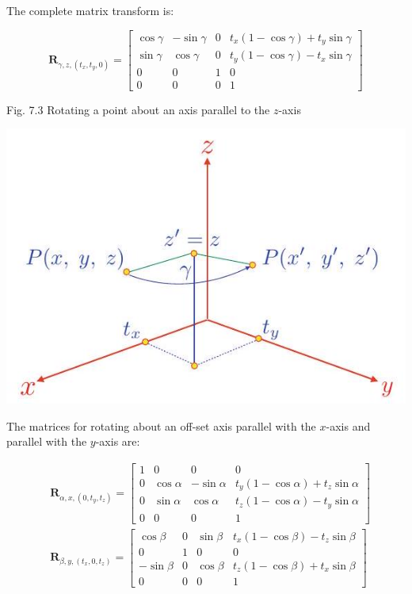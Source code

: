 \documentclass[10pt]{article}
\begin{document}
The complete matrix transform is:

$$
\mathbf{R}_{\gamma, z,\left(t_{x}, t_{y}, 0\right)}=\left[\begin{array}{cccc}
\cos \gamma & -\sin \gamma & 0 & t_{x}(1-\cos \gamma)+t_{y} \sin \gamma \\
\sin \gamma & \cos \gamma & 0 & t_{y}(1-\cos \gamma)-t_{x} \sin \gamma \\
0 & 0 & 1 & 0 \\
0 & 0 & 0 & 1
\end{array}\right]
$$

Fig. 7.3 Rotating a point about an axis parallel to the $z$-axis

\begin{center}
\includegraphics[max width=\textwidth]{2023_04_20_41f1ceac5a31dc7d1b59g-118}
\end{center}

The matrices for rotating about an off-set axis parallel with the $x$-axis and parallel with the $y$-axis are:

$$
\begin{aligned}
& \mathbf{R}_{\alpha, x,\left(0, t_{y}, t_{z}\right)}= {\left[\begin{array}{cccc}
1 & 0 & 0 & 0 \\
0 & \cos \alpha & -\sin \alpha & t_{y}(1-\cos \alpha)+t_{z} \sin \alpha \\
0 & \sin \alpha & \cos \alpha & t_{z}(1-\cos \alpha)-t_{y} \sin \alpha \\
0 & 0 & 0 & 1
\end{array}\right] } \\
& \mathbf{R}_{\beta, y,\left(t_{x}, 0, t_{z}\right)}=\left[\begin{array}{cccc}
\cos \beta & 0 & \sin \beta & t_{x}(1-\cos \beta)-t_{z} \sin \beta \\
0 & 1 & 0 & 0 \\
-\sin \beta & 0 & \cos \beta & t_{z}(1-\cos \beta)+t_{x} \sin \beta \\
0 & 0 & 0 & 1
\end{array}\right]
\end{aligned}
$$
\end{document}

